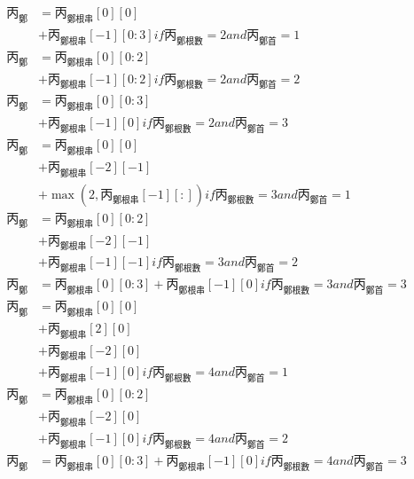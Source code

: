\documentclass{article}
\begin{document}
\begin{subequations}
  \begin{align}
  \mbox{丙}_{\mbox{鄭}} &= \mbox{丙}_{\mbox{鄭根串}}[0][0]\\
      & + \mbox{丙}_{\mbox{鄭根串}}[-1][0:3] if \mbox{丙}_{\mbox{鄭根數}}=2 and \mbox{丙}_{\mbox{鄭首}}=1 \\
  \mbox{丙}_{\mbox{鄭}} &= \mbox{丙}_{\mbox{鄭根串}}[0][0:2]\\
      & + \mbox{丙}_{\mbox{鄭根串}}[-1][0:2] if \mbox{丙}_{\mbox{鄭根數}}=2 and \mbox{丙}_{\mbox{鄭首}}=2 \\
  \mbox{丙}_{\mbox{鄭}} &= \mbox{丙}_{\mbox{鄭根串}}[0][0:3]\\
      & + \mbox{丙}_{\mbox{鄭根串}}[-1][0] if \mbox{丙}_{\mbox{鄭根數}}=2 and \mbox{丙}_{\mbox{鄭首}}=3 \\
  \mbox{丙}_{\mbox{鄭}} &= \mbox{丙}_{\mbox{鄭根串}}[0][0]\\
      & + \mbox{丙}_{\mbox{鄭根串}}[-2][-1]\\
      & + \max(2, \mbox{丙}_{\mbox{鄭根串}}[-1][:]) if \mbox{丙}_{\mbox{鄭根數}}=3 and \mbox{丙}_{\mbox{鄭首}}=1 \\
  \mbox{丙}_{\mbox{鄭}} &= \mbox{丙}_{\mbox{鄭根串}}[0][0:2]\\
      & + \mbox{丙}_{\mbox{鄭根串}}[-2][-1]\\
      & + \mbox{丙}_{\mbox{鄭根串}}[-1][-1] if \mbox{丙}_{\mbox{鄭根數}}=3 and \mbox{丙}_{\mbox{鄭首}}=2 \\
  \mbox{丙}_{\mbox{鄭}} &= \mbox{丙}_{\mbox{鄭根串}}[0][0:3]+\mbox{丙}_{\mbox{鄭根串}}[-1][0]
      if \mbox{丙}_{\mbox{鄭根數}}=3 and \mbox{丙}_{\mbox{鄭首}}=3\\
  \mbox{丙}_{\mbox{鄭}} &= \mbox{丙}_{\mbox{鄭根串}}[0][0]\\
      & + \mbox{丙}_{\mbox{鄭根串}}[2][0]\\
      & + \mbox{丙}_{\mbox{鄭根串}}[-2][0]\\
      & + \mbox{丙}_{\mbox{鄭根串}}[-1][0] if \mbox{丙}_{\mbox{鄭根數}}=4 and \mbox{丙}_{\mbox{鄭首}}=1\\
  \mbox{丙}_{\mbox{鄭}} &= \mbox{丙}_{\mbox{鄭根串}}[0][0:2]\\
      & + \mbox{丙}_{\mbox{鄭根串}}[-2][0]\\
      & + \mbox{丙}_{\mbox{鄭根串}}[-1][0] if \mbox{丙}_{\mbox{鄭根數}}=4 and \mbox{丙}_{\mbox{鄭首}}=2\\
  \mbox{丙}_{\mbox{鄭}} &= \mbox{丙}_{\mbox{鄭根串}}[0][0:3]+\mbox{丙}_{\mbox{鄭根串}}[-1][0]
      if \mbox{丙}_{\mbox{鄭根數}}=4 and \mbox{丙}_{\mbox{鄭首}}=3\\
  \end{align}
\end{subequations}
\end{document}
